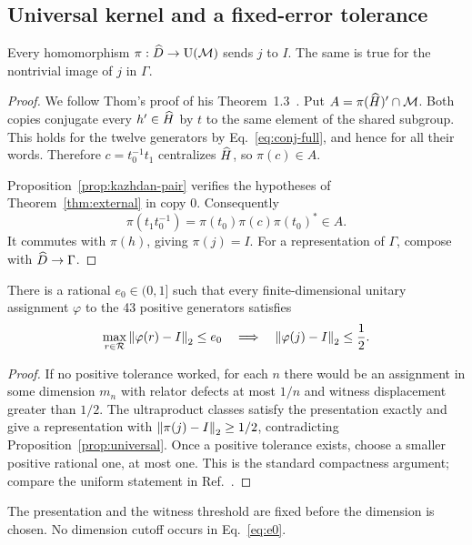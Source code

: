 \FloatBarrier
\subsection{Universal kernel and a fixed-error tolerance}
\begin{proposition}\label{prop:universal}
Every homomorphism $\pi:\widehat D\to\operatorname{U}(\mathcal M)$ sends $j$ to $I$. The same is true for the
nontrivial image of $j$ in $\Gamma$.
\end{proposition}
\begin{proof}
We follow Thom's proof of his Theorem~1.3~\cite[Section~5.2]{thom}.
Put $A=\pi(\widehat H)'\cap\mathcal M$. Both copies conjugate every $h'\in\widehat H$ by $t$ to the same
element of the shared subgroup. This holds for the twelve generators by
Eq.~\eqref{eq:conj-full}, and hence for all their words. Therefore
$c=t_0^{-1}t_1$ centralizes $\widehat H$, so $\pi(c)\in A$.

Proposition~\ref{prop:kazhdan-pair} verifies the hypotheses of
Theorem~\ref{thm:external} in copy 0. Consequently
\[
 \pi(t_1t_0^{-1})=\pi(t_0)\pi(c)\pi(t_0)^*\in A.
\]
It commutes with $\pi(h)$, giving $\pi(j)=I$. For a representation of $\Gamma$, compose
with $\widehat D\to\Gamma$.
\end{proof}

\begin{corollary}\label{cor:tolerance}
There is a rational $e_0\in(0,1]$ such that every finite-dimensional unitary assignment
$\varphi$ to the 43 positive generators satisfies
\begin{equation}
 \max_{r\in\mathcal R}\left\lVert \varphi(r)-I\right\rVert_2\le e_0
 \quad\Longrightarrow\quad\left\lVert \varphi(j)-I\right\rVert_2\le\frac12.
 \label{eq:e0}
\end{equation}
\end{corollary}
\begin{proof}
If no positive tolerance worked, for each $n$ there would be an assignment in some dimension
$m_n$ with relator defects at most $1/n$ and witness displacement greater than $1/2$.
The ultraproduct classes satisfy the presentation exactly and give a representation with
$\left\lVert \pi(j)-I\right\rVert_2\ge1/2$, contradicting Proposition~\ref{prop:universal}. Once a positive
tolerance exists, choose a smaller positive rational one, at most one. This is the standard
compactness argument; compare the uniform statement in Ref.~\cite[Theorem~1.1]{liu}.
\end{proof}

The presentation and the witness threshold are fixed before the dimension is chosen.
No dimension cutoff occurs in Eq.~\eqref{eq:e0}.

